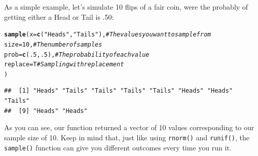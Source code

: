 \documentclass{tufte-book}\usepackage[]{graphicx}\usepackage[]{color}
\makeatletter
\newcommand{\hlnum}[1]{\textcolor[rgb]{0.686,0.059,0.569}{#1}}%
\newcommand{\hlstr}[1]{\textcolor[rgb]{0.192,0.494,0.8}{#1}}%
\newcommand{\hlcom}[1]{\textcolor[rgb]{0.678,0.584,0.686}{\textit{#1}}}%
\newcommand{\hlstd}[1]{\textcolor[rgb]{0.345,0.345,0.345}{#1}}%
\newcommand{\hlkwc}[1]{\textcolor[rgb]{0.333,0.667,0.333}{#1}}%
\newcommand{\hlkwd}[1]{\textcolor[rgb]{0.737,0.353,0.396}{\textbf{#1}}}%
\newenvironment{kframe}{%
 \def\at@end@of@kframe{}%
 \ifinner\ifhmode%
  \def\at@end@of@kframe{\end{minipage}}%
  \begin{minipage}{\columnwidth}%
 \fi\fi%
 \def\FrameCommand##1{\hskip\@totalleftmargin \hskip-\fboxsep
 \colorbox{shadecolor}{##1}\hskip-\fboxsep
     \hskip-\linewidth \hskip-\@totalleftmargin \hskip\columnwidth}%
 \MakeFramed {\advance\hsize-\width
   \@totalleftmargin\z@ \linewidth\hsize
   \@setminipage}}%
 {\par\unskip\endMakeFramed%
 \at@end@of@kframe}
\newenvironment{knitrout}{}{} %
\makeatother
\begin{document}
As a simple example, let's simulate 10 flips of a fair coin, were the probably of getting either a Head or Tail is .50:

\begin{footnotesize}
\begin{knitrout}
\color{fgcolor}\begin{kframe}
\begin{alltt}
\hlkwd{sample}\hlstd{(}\hlkwc{x} \hlstd{=} \hlkwd{c}\hlstd{(}\hlstr{"Heads"}\hlstd{,} \hlstr{"Tails"}\hlstd{),} \hlcom{# The values you want to sample from}
       \hlkwc{size} \hlstd{=} \hlnum{10}\hlstd{,}  \hlcom{# The number of samples}
       \hlkwc{prob} \hlstd{=} \hlkwd{c}\hlstd{(}\hlnum{.5}\hlstd{,} \hlnum{.5}\hlstd{),} \hlcom{# The probability of each value}
       \hlkwc{replace} \hlstd{= T} \hlcom{# Sampling with replacement}
       \hlstd{)}
\end{alltt}
\begin{verbatim}
##  [1] "Heads" "Tails" "Tails" "Tails" "Tails" "Heads" "Heads" "Tails"
##  [9] "Heads" "Heads"
\end{verbatim}
\end{kframe}
\end{knitrout}
\end{footnotesize}

As you can see, our function returned a vector of 10 values corresponding to our sample size of 10. Keep in mind that, just like using \texttt{rnorm()} and \texttt{runif()}, the \texttt{sample()} function can give you different outcomes every time you run it.
\end{document}
